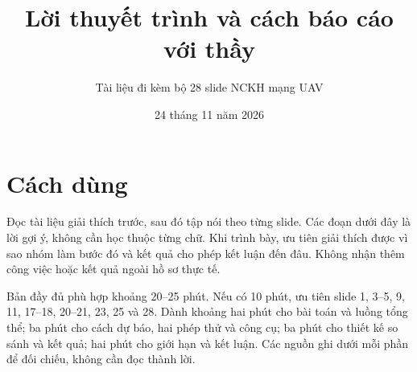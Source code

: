 \documentclass[12pt,a4paper]{article}
\title{\sffamily\bfseries Lời thuyết trình và cách báo cáo với thầy}
\author{Tài liệu đi kèm bộ 28 slide NCKH mạng UAV}
\date{24 tháng 11 năm 2026}
\begin{document}
\maketitle
\section*{Cách dùng}
Đọc tài liệu giải thích trước, sau đó tập nói theo từng slide. Các đoạn dưới đây là lời gợi ý, không cần học thuộc từng chữ. Khi trình bày, ưu tiên giải thích được vì sao nhóm làm bước đó và kết quả cho phép kết luận đến đâu. Không nhận thêm công việc hoặc kết quả ngoài hồ sơ thực tế.

Bản đầy đủ phù hợp khoảng 20--25 phút. Nếu có 10 phút, ưu tiên slide 1, 3--5, 9, 11, 17--18, 20--21, 23, 25 và 28. Dành khoảng hai phút cho bài toán và luồng tổng thể; ba phút cho cách dự báo, hai phép thử và công cụ; ba phút cho thiết kế so sánh và kết quả; hai phút cho giới hạn và kết luận. Các nguồn ghi dưới mỗi phần để đối chiếu, không cần đọc thành lời.

\end{document}
